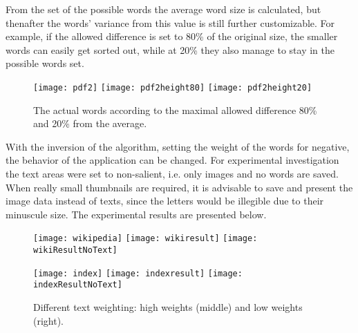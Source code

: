 \documentclass[draft,final]{vutinfth} %
\begin{document}
	From the set of the possible words the average word size is calculated, but thenafter the words' variance from this value is still further customizable.
	For example, if the allowed difference is set to 80\% of the original size, the smaller words can easily get sorted out, while at 20\% they also manage to stay in the possible words set.\par 
	\begin{figure}[H]
		\texttt{[image: pdf2]}\hfill
		\texttt{[image: pdf2height80]}\hfill
		\texttt{[image: pdf2height20]}
		\caption{The actual words according to the maximal allowed difference 80\% and 20\% from the average.  }
	\end{figure}  
	With the inversion of the algorithm, setting the weight of the words for negative, the behavior of the application can be changed.
	For experimental investigation the text areas were set to non-salient, i.e. only images and no words are saved. 
	When really small thumbnails are required, it  is advisable to save and present the image data instead of texts, since the letters would be illegible due to their minuscule size.  
	The experimental results are presented below.
	\begin{figure}[H]		
		\texttt{[image: wikipedia]}\hfill
		\texttt{[image: wikiresult]}\hfill
		\texttt{[image: wikiResultNoText]}
		
		\texttt{[image: index]}\hfill
		\texttt{[image: indexresult]}\hfill
		\texttt{[image: indexResultNoText]}
		
		\caption{Different text weighting: high weights (middle) and low weights (right).  }
	\end{figure} 
\end{document}
